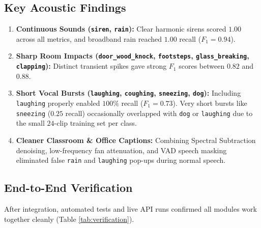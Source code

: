 \documentclass[letterpaper,12pt]{article}
\begin{document}
\subsection{Key Acoustic Findings}
\begin{enumerate}
    \item \textbf{Continuous Sounds (\texttt{siren}, \texttt{rain}):} Clear harmonic sirens scored $1.00$ across all metrics, and broadband rain reached $1.00$ recall ($F_1 = 0.94$).
    \item \textbf{Sharp Room Impacts (\texttt{door\_wood\_knock}, \texttt{footsteps}, \texttt{glass\_breaking}, \texttt{clapping}):} Distinct transient spikes gave strong $F_1$ scores between $0.82$ and $0.88$.
    \item \textbf{Short Vocal Bursts (\texttt{laughing}, \texttt{coughing}, \texttt{sneezing}, \texttt{dog}):} Including \texttt{laughing} properly enabled $100\%$ recall ($F_1 = 0.73$). Very short bursts like \texttt{sneezing} ($0.25$ recall) occasionally overlapped with \texttt{dog} or \texttt{laughing} due to the small $24$-clip training set per class.
    \item \textbf{Cleaner Classroom \& Office Captions:} Combining Spectral Subtraction denoising, low-frequency fan attenuation, and VAD speech masking eliminated false \texttt{rain} and \texttt{laughing} pop-ups during normal speech.
\end{enumerate}

\subsection{End-to-End Verification}
After integration, automated tests and live API runs confirmed all modules work together cleanly (Table \ref{tab:verification}).

\begin{table}[!ht]
\centering
\caption{Verified System Build, Test Suite, and Live API Checks}
\vspace{4pt}
\label{tab:verification}
\end{table}
\end{document}

